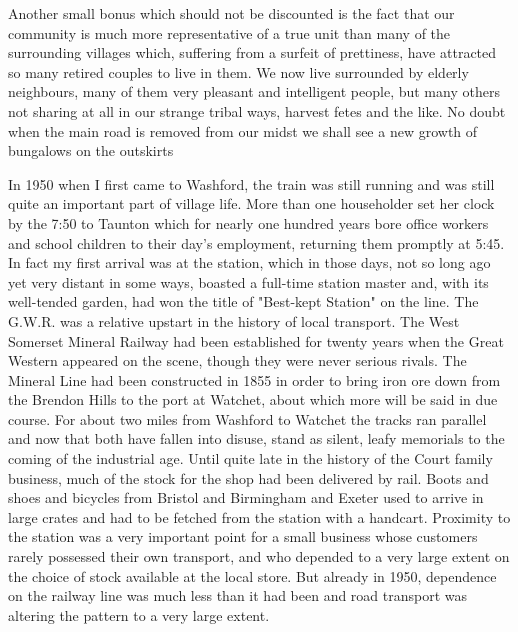 Another small bonus which should not be discounted is the fact that our community is much more representative of a true unit than many of the surrounding villages which, suffering from a surfeit of prettiness, have attracted so many retired couples to live in them. We now live surrounded by elderly neighbours, many of them very pleasant and intelligent people, but many others not sharing at all in our strange tribal ways, harvest fetes and the like. No doubt when the main road is removed from our midst we shall see a new growth of bungalows on the outskirts

In 1950 when I first came to Washford, the train was still running and was still quite an important part of village life. More than one householder set her clock by the 7:50 to Taunton which for nearly one hundred years bore office workers and school children to their day's employment, returning them promptly at 5:45. In fact my first arrival was at the station, which in those days, not so long ago yet very distant in some ways, boasted a full-time station master and, with its well-tended garden, had won the title of "Best-kept Station" on the line. The G.W.R. was a relative upstart in the history of local transport. The West Somerset Mineral Railway had been established for twenty years when the Great Western appeared on the scene, though they were never serious rivals. The Mineral Line had been constructed in 1855 in order to bring iron ore down from the Brendon Hills to the port at Watchet, about which more will be said in due course. For about two miles from Washford to Watchet the tracks ran parallel and now that both have fallen into disuse, stand as silent, leafy memorials to the coming of the industrial age. Until quite late in the history of the Court family business, much of the stock for the shop had been delivered by rail. Boots and shoes and bicycles from Bristol and Birmingham and Exeter used to arrive in large crates and had to be fetched from the station with a handcart. Proximity to the station was a very important point for a small business whose customers rarely possessed their own transport, and who depended to a very large extent on the choice of stock available at the local store. But already in 1950, dependence on the railway line was much less than it had been and road transport was altering the pattern to a very large extent.

